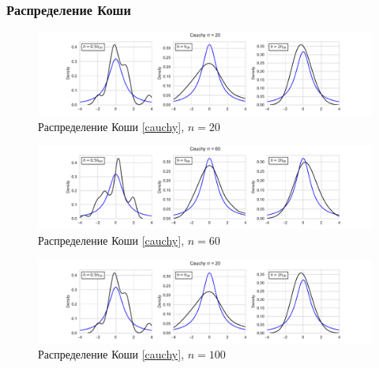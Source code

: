\documentclass[a4paper]{article}
\begin{document}
\subsubsection{Распределение Коши}
\begin{figure}[H]
    \centering
    \includegraphics[width = 16 cm]{sources/cauchyKde20.pdf}
    \caption{Распределение Коши \eqref{cauchy}, $n = 20$}
    \label{fig:cauchyKDE20}
\end{figure}
\begin{figure}[H]
    \centering
    \includegraphics[width = 16 cm]{sources/cauchyKde60.pdf}
    \caption{Распределение Коши \eqref{cauchy}, $n = 60$}
    \label{fig:cauchyKDE60}
\end{figure}
\begin{figure}[H]
    \centering
    \includegraphics[width = 16 cm]{sources/cauchyKde20.pdf}
    \caption{Распределение Коши \eqref{cauchy}, $n = 100$}
    \label{fig:cauchyKDE100}
\end{figure}
\end{document}
